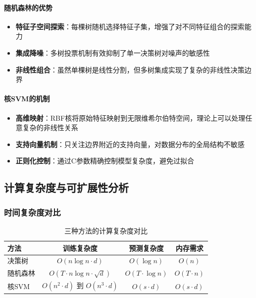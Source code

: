 \documentclass[UTF8]{report}
\theoremstyle{MyLineTheoremStyle} %
\theoremstyle{MyBlockTheoremStyle} %
\theoremstyle{MySubsubsectionStyle} %
\begin{document}
\paragraph{随机森林的优势}
\begin{itemize}
    \item \textbf{特征子空间探索}：每棵树随机选择特征子集，增强了对不同特征组合的探索能力
    \item \textbf{集成降噪}：多树投票机制有效抑制了单一决策树对噪声的敏感性
    \item \textbf{非线性组合}：虽然单棵树是线性分割，但多树集成实现了复杂的非线性决策边界
\end{itemize}

\paragraph{核SVM的机制}
\begin{itemize}
    \item \textbf{高维映射}：RBF核将原始特征映射到无限维希尔伯特空间，理论上可以处理任意复杂的非线性关系
    \item \textbf{支持向量机制}：只关注边界附近的支持向量，对数据分布的全局结构不敏感
    \item \textbf{正则化控制}：通过C参数精确控制模型复杂度，避免过拟合
\end{itemize}

\subsection{计算复杂度与可扩展性分析}

\subsubsection{时间复杂度对比}

\begin{table}[h]
\centering
\caption{三种方法的计算复杂度对比}
\begin{tabular}{l c c c}
\toprule
\textbf{方法} & \textbf{训练复杂度} & \textbf{预测复杂度} & \textbf{内存需求} \\
\midrule
决策树 & $O(n \log n \cdot d)$ & $O(\log n)$ & $O(n)$ \\
随机森林 & $O(T \cdot n \log n \cdot \sqrt{d})$ & $O(T \cdot \log n)$ & $O(T \cdot n)$ \\
核SVM & $O(n^2 \cdot d)$ 到 $O(n^3 \cdot d)$ & $O(s \cdot d)$ & $O(s \cdot d)$ \\
\bottomrule
\end{tabular}
\end{table}
\end{document}
